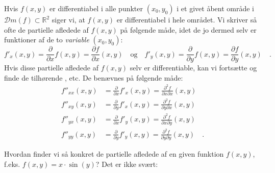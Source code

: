 \begin{definition} \label{defPartialPartial}
Hvis $f(x,y)$ er differentiabel i alle punkter $(x_{0}, y_{0})$ i et givet åbent område i $\mathcal{D}m(f) \subset \mathbb{R}^{2}$ siger vi, at $f(x,y)$ er differentiabel i hele området. Vi skriver så ofte de partielle afledede af $f(x,y)$ på følgende måde, idet de jo dermed selv er funktioner af de to \emph{variable} $(x_{0}, y_{0})$:
\begin{equation}
f'_{x}(x, y) = \frac{\partial}{\partial x}f(x,y) =  \frac{\partial f}{\partial x}(x,y)\quad \textrm{og} \quad  f'_{y}(x, y) = \frac{\partial}{\partial y}f(x,y) = \frac{\partial f}{\partial y}(x, y) \quad .
\end{equation}
Hvis disse partielle afledede af $f(x,y)$ selv er differentiable, kan vi fortsætte og finde de tilhørende , etc. De benævnes på følgende måde:
\begin{equation}
\begin{aligned}
f''_{xx}(x, y) &= \frac{\partial}{\partial x}f'_{x}(x,y) =  \frac{\partial^{2} f}{\partial x \partial x}(x,y) \\
f''_{xy}(x, y) &= \frac{\partial}{\partial y}f'_{x}(x,y) =  \frac{\partial^{2} f}{\partial y \partial x}(x,y) \\
f''_{yx}(x, y) &= \frac{\partial}{\partial x}f'_{y}(x,y) =  \frac{\partial^{2} f}{\partial x \partial y}(x,y) \\
f''_{yy}(x, y) &= \frac{\partial}{\partial y}f'_{y}(x,y) =  \frac{\partial^{2} f}{\partial y \partial y}(x,y) \quad .
\end{aligned}
\end{equation}
\end{definition}




Hvordan finder vi så konkret de partielle afledede af en given funktion $f(x,y)$, f.eks. $f(x,y) = x\cdot \sin(y)$? Det er ikke svært:


